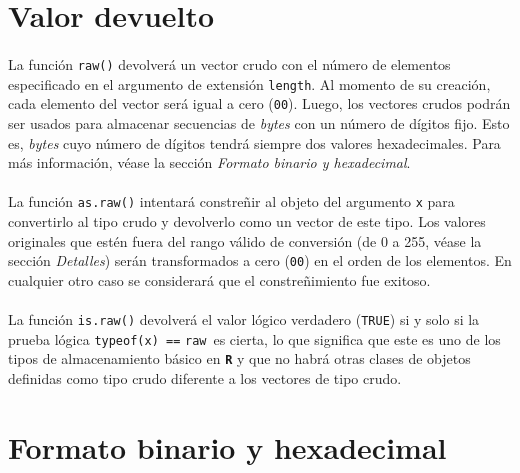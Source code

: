 \documentclass{article}[letter, 12pt]
\def\code#1{\texttt{#1}}
\def\codename#1{\textbf{\texttt{\color{gray}#1}}}
\begin{document}
\section{\color{gray}Valor devuelto}

\paragraph{}La función \code{raw()} devolverá un vector crudo con el número de elementos especificado en el argumento de extensión \code{length}. Al momento de su creación, cada elemento del vector será igual a cero (\code{00}). Luego, los vectores crudos podrán ser usados para almacenar secuencias de \textit{bytes} con un número de dígitos fijo. Esto es, \textit{bytes} cuyo número de dígitos tendrá siempre dos valores hexadecimales. Para más información, véase la sección \textit{Formato binario y hexadecimal}.\par

\paragraph{}La función \code{as.raw()} intentará constreñir al objeto del argumento \code{x} para convertirlo al tipo crudo y devolverlo como un vector de este tipo. Los valores originales que estén fuera del rango válido de conversión (de 0 a 255, véase la sección \textit{Detalles}) serán transformados a cero (\code{00}) en el orden de los elementos. En cualquier otro caso se considerará que el constreñimiento fue exitoso.\par

\paragraph{}La función \code{is.raw()} devolverá el valor lógico verdadero (\code{TRUE}) si y solo si la prueba lógica \code{typeof(x) ==} \textquotedbl\code{raw}\textquotedbl\  es cierta, lo que significa que este es uno de los tipos de almacenamiento básico en \codename{R} y que no habrá otras clases de objetos definidas como tipo crudo diferente a los vectores de tipo crudo.\par



\section{\color{gray}Formato binario y hexadecimal}
\end{document}
